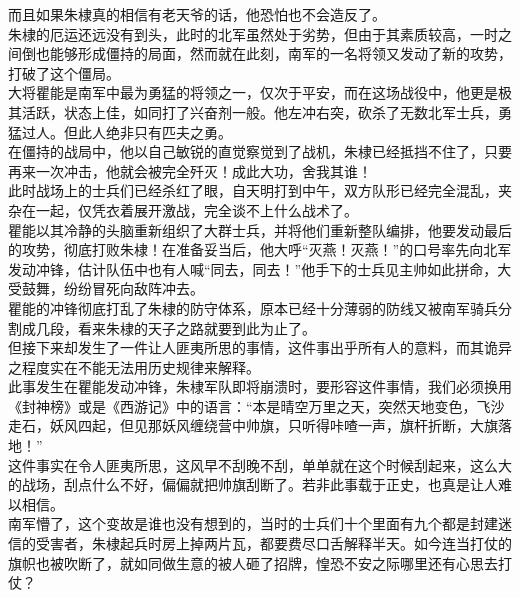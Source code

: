 \begin{multicols}{\theparacolNo}
而且如果朱棣真的相信有老天爷的话，他恐怕也不会造反了。\\

朱棣的厄运还远没有到头，此时的北军虽然处于劣势，但由于其素质较高，一时之间倒也能够形成僵持的局面，然而就在此刻，南军的一名将领又发动了新的攻势，打破了这个僵局。\\

大将瞿能是南军中最为勇猛的将领之一，仅次于平安，而在这场战役中，他更是极其活跃，状态上佳，如同打了兴奋剂一般。他左冲右突，砍杀了无数北军士兵，勇猛过人。但此人绝非只有匹夫之勇。\\

在僵持的战局中，他以自己敏锐的直觉察觉到了战机，朱棣已经抵挡不住了，只要再来一次冲击，他就会被完全歼灭！成此大功，舍我其谁！\\

此时战场上的士兵们已经杀红了眼，自天明打到中午，双方队形已经完全混乱，夹杂在一起，仅凭衣着展开激战，完全谈不上什么战术了。\\

瞿能以其冷静的头脑重新组织了大群士兵，并将他们重新整队编排，他要发动最后的攻势，彻底打败朱棣！在准备妥当后，他大呼“灭燕！灭燕！”的口号率先向北军发动冲锋，估计队伍中也有人喊“同去，同去！”他手下的士兵见主帅如此拼命，大受鼓舞，纷纷冒死向敌阵冲去。\\

瞿能的冲锋彻底打乱了朱棣的防守体系，原本已经十分薄弱的防线又被南军骑兵分割成几段，看来朱棣的天子之路就要到此为止了。\\

但接下来却发生了一件让人匪夷所思的事情，这件事出乎所有人的意料，而其诡异之程度实在不能无法用历史规律来解释。\\

此事发生在瞿能发动冲锋，朱棣军队即将崩溃时，要形容这件事情，我们必须换用《封神榜》或是《西游记》中的语言：“本是晴空万里之天，突然天地变色，飞沙走石，妖风四起，但见那妖风缠绕营中帅旗，只听得咔喳一声，旗杆折断，大旗落地！”\\

这件事实在令人匪夷所思，这风早不刮晚不刮，单单就在这个时候刮起来，这么大的战场，刮点什么不好，偏偏就把帅旗刮断了。若非此事载于正史，也真是让人难以相信。\\

南军懵了，这个变故是谁也没有想到的，当时的士兵们十个里面有九个都是封建迷信的受害者，朱棣起兵时房上掉两片瓦，都要费尽口舌解释半天。如今连当打仗的旗帜也被吹断了，就如同做生意的被人砸了招牌，惶恐不安之际哪里还有心思去打仗？\\


\end{multicols}
